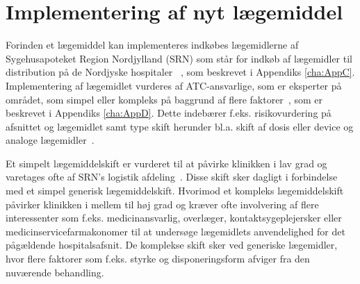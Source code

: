 \section{Implementering af nyt lægemiddel}
Forinden et lægemiddel kan implementeres indkøbes lægemidlerne af Sygehusapoteket Region Nordjylland (SRN) som står for indkøb af lægemidler til distribution på de Nordjyske hospitaler ~\citep{SygehusapoteketRegionNordjylland2013}, som beskrevet i Appendiks \ref{cha:AppC}. Implementering af lægemidlet vurderes af ATC-ansvarlige, som er eksperter på området, som simpel eller kompleks på baggrund af flere faktorer~\citep{Sygehusapoteket2017}, som er beskrevet i Appendiks \ref{cha:AppD}. Dette indebærer f.eks. risikovurdering på afsnittet og lægemidlet samt type skift herunder bl.a. skift af dosis eller device og analoge lægemidler~\citep{Sygehusapoteket2017}. 

Et simpelt lægemiddelskift er vurderet til at påvirke klinikken i lav grad og varetages ofte af SRN's logistik afdeling~\citep{Laegemiddelinformaion2017, Sygehusapoteket2017a}. Disse skift sker dagligt i forbindelse med et simpel generisk lægemiddelskift. Hvorimod et kompleks lægemiddelskift påvirker klinikken i mellem til høj grad og kræver ofte involvering af flere interessenter som f.eks. medicinansvarlig, overlæger, kontaktsygeplejersker eller medicinservicefarmakonomer til at undersøge lægemidlets anvendelighed for det pågældende hospitalsafsnit. 
De komplekse skift sker ved generiske lægemidler, hvor flere faktorer som f.eks. styrke og disponeringsform afviger fra den nuværende behandling.~\citep{Laegemiddelinformaion2017,Sygehusapoteket2017a}
